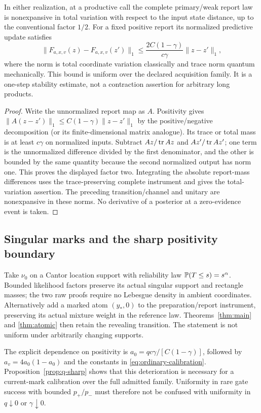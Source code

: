 \begin{lemma}\label{lem:raw-continuity}
In either realization, at a productive call the complete primary/weak report law is nonexpansive in total variation with respect to the input state distance, up to the conventional factor $1/2$. For a fixed positive report its normalized predictive update satisfies
\[
 \|F_{a,x,v}(z)-F_{a,x,v}(z')\|_1
 \le \frac{2C(1-\gamma)}{c\gamma}\|z-z'\|_1,
\]
where the norm is total coordinate variation classically and trace norm quantum mechanically. This bound is uniform over the declared acquisition family. It is a one-step stability estimate, not a contraction assertion for arbitrary long products.
\end{lemma}
\begin{proof}
Write the unnormalized report map as $A$. Positivity gives
$\|A(z-z')\|_1\le C(1-\gamma)\|z-z'\|_1$ by the positive/negative decomposition (or its finite-dimensional matrix analogue). Its trace or total mass is at least $c\gamma$ on normalized inputs. Subtract $Az/\operatorname{tr} Az$ and $Az'/\operatorname{tr} Az'$; one term is the unnormalized difference divided by the first denominator, and the other is bounded by the same quantity because the second normalized output has norm one. This proves the displayed factor two. Integrating the absolute report-mass differences uses the trace-preserving complete instrument and gives the total-variation assertion. The preceding transition/channel and unitary are nonexpansive in these norms. No derivative of a posterior at a zero-evidence event is taken.
\end{proof}

\subsection*{Singular marks and the sharp positivity boundary}
Take $\nu_0$ on a Cantor location support with reliability law $\mathbb P(T\le s)=s^\alpha$. Bounded likelihood factors preserve its actual singular support and rectangle masses; the two raw proofs require no Lebesgue density in ambient coordinates. Alternatively add a marked atom $(y_*,0)$ to the preparation/report instrument, preserving its actual mixture weight in the reference law. Theorems~\ref{thm:main} and \ref{thm:atomic} then retain the revealing transition. The statement is not uniform under arbitrarily changing supports.

The explicit dependence on positivity is $a_0=qc\gamma/[C(1-\gamma)]$, followed by $a_v=4a_0(1-a_0)$ and the constants in \eqref{eq:ordinary-calibration}. Proposition~\ref{prop:q-sharp} shows that this deterioration is necessary for a current-mark calibration over the full admitted family. Uniformity in rare gate success with bounded $p_+/p_-$ must therefore not be confused with uniformity in $q\downarrow0$ or $\gamma\downarrow0$.


